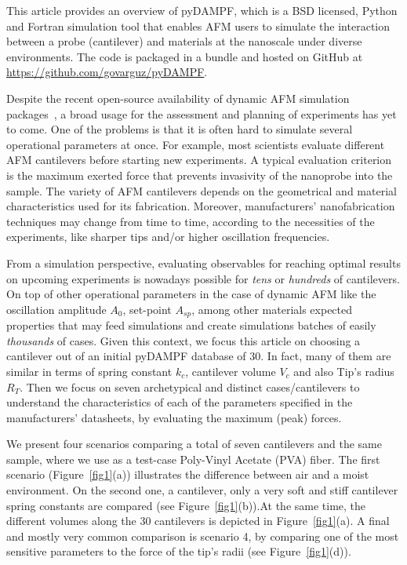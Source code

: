 \documentclass[letterpaper,compsoc,twoside]{IEEEtran}
\begin{document}
This article provides an overview of pyDAMPF, which is a BSD licensed, Python and Fortran simulation tool that enables AFM users to simulate the interaction between a probe (cantilever) and materials at the nanoscale under diverse environments. The code is packaged in a bundle and hosted on GitHub at \url{https://github.com/govarguz/pyDAMPF}. 

Despite the recent open-source availability of dynamic AFM simulation packages~\cite{dForce,Veda}, a broad usage for the assessment and planning of experiments has yet to come. One of the problems is that it is often hard to simulate several operational parameters at once. For example, most scientists evaluate different AFM cantilevers before starting new experiments. A typical evaluation criterion is the maximum exerted force that prevents invasivity of the nanoprobe into the sample. The variety of AFM cantilevers depends on the geometrical and material characteristics used for its fabrication. Moreover, manufacturers' nanofabrication techniques may change from time to time, according to the necessities of the experiments, like sharper tips and/or higher oscillation frequencies. 

From a simulation perspective, evaluating observables for reaching optimal results on upcoming experiments is nowadays possible for \textit{tens} or \textit{hundreds} of cantilevers. On top of other operational parameters in the case of dynamic AFM like the oscillation amplitude $A_0$, set-point $A_{sp}$, among other materials expected properties that may feed simulations and create simulations batches of easily \textit{thousands} of cases. 
Given this context, we focus this article on choosing a cantilever out of an initial pyDAMPF database of 30. In fact, many of them are similar in terms of spring constant $k_c$, cantilever volume $V_c$ and also Tip's radius $R_T$. Then we focus on seven archetypical and distinct cases/cantilevers to understand the characteristics of each of the parameters specified in the manufacturers' datasheets, by evaluating the maximum (peak) forces.

We present four scenarios comparing a total of seven cantilevers and the same sample, where we use as a test-case Poly-Vinyl Acetate (PVA) fiber. The first scenario (Figure~\ref{fig1}(a)) illustrates the difference between air and a moist environment. On the second one, a cantilever, only a very soft and stiff cantilever spring constants are compared (see Figure~\ref{fig1}(b)).At the same time, the different volumes along the 30 cantilevers is depicted in Figure~\ref{fig1}(a). A final and mostly very common comparison is scenario 4, by comparing one of the most sensitive parameters to the force of the tip's radii (see Figure~\ref{fig1}(d)).
\end{document}
